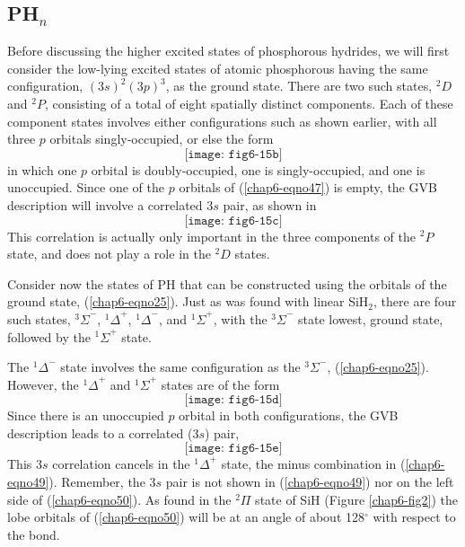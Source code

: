 \subsection{PH$_n$}

Before discussing the higher excited states of phosphorous hydrides,
we will first consider the low-lying excited states of atomic phosphorous 
having the same configuration, $(3s)^2 (3p)^3$, as the ground state. There 
are two such states, ${^2D}$ and ${^2P}$, consisting of a total of eight 
spatially distinct components.  Each of these component states 
involves either configurations such as shown earlier, with all three 
$p$ orbitals singly-occupied, or else the form
\begin{equation}
\texttt{[image: fig6-15b]}
\label{chap6-eqno47}
\end{equation}
in which one $p$ orbital is doubly-occupied, one is singly-occupied,
and one is unoccupied.  Since one of the $p$ orbitals of
(\ref{chap6-eqno47}) is empty, the GVB
description will involve a correlated $3s$ pair, as shown in
\begin{equation}
\texttt{[image: fig6-15c]}
\label{chap6-eqno48}
\end{equation}
This correlation is actually only important in the three components 
of the ${^2P}$ state, and does not play a role in the ${^2D}$ states.

Consider now the states of PH that can be constructed using the
orbitals of the ground state, (\ref{chap6-eqno25}).  Just as was found
with linear SiH$_2$, there are four such states, ${^3\Sigma}^-$,
${^1\Delta}^+$, ${^1\Delta}^-$, and ${^1\Sigma}^+$, with the
${^3\Sigma}^-$ state lowest, ground state, followed by the
${^1\Sigma}^+$ state.

The ${^1\Delta}^-$ state involves the same configuration as the
${^3\Sigma}^-$, (\ref{chap6-eqno25}).  However, the ${^1\Delta}^+$ and
${^1\Sigma}^+$ states are of the form
\begin{equation}
\texttt{[image: fig6-15d]}
\label{chap6-eqno49}
\end{equation}
Since there is an unoccupied $p$ orbital in both configurations, the 
GVB description leads to a correlated ($3s$) pair,
\begin{equation}
\texttt{[image: fig6-15e]}
\label{chap6-eqno50}
\end{equation}
This $3s$ correlation cancels in the ${^1\Delta}^+$ state, the minus
combination in (\ref{chap6-eqno49}).  Remember, the $3s$ pair is not
shown in (\ref{chap6-eqno49}) nor on the left side of
(\ref{chap6-eqno50}).  As found in the ${^2\Pi}$ state of SiH (Figure
\ref{chap6-fig2}) the lobe orbitals of (\ref{chap6-eqno50}) will be at
an angle of about 128$^{\circ}$ with respect to the bond.

